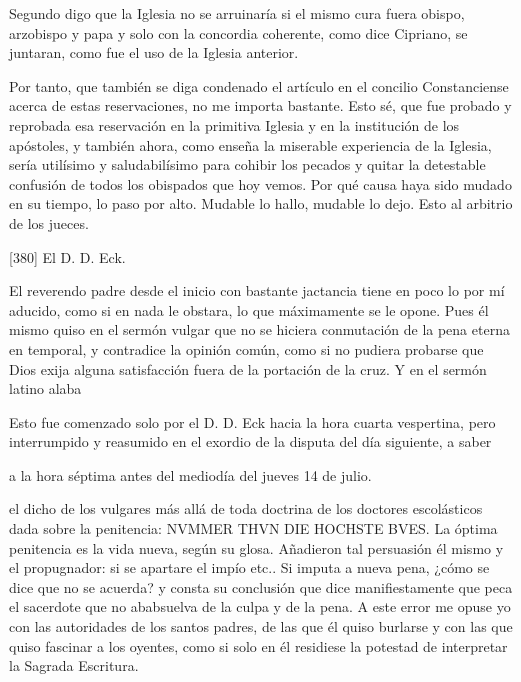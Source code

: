 Segundo digo que la Iglesia no se arruinaría si el mismo cura fuera obispo, arzobispo y papa y solo con la concordia coherente, como dice Cipriano, se juntaran, como fue el uso de la Iglesia anterior.

Por tanto, que también se diga condenado el artículo en el concilio Constanciense acerca de estas reservaciones, no me importa bastante. Esto sé, que fue probado y reprobada esa reservación en la primitiva Iglesia y en la institución de los apóstoles, y también ahora, como enseña la miserable experiencia de la Iglesia, sería utilísimo y saludabilísimo para cohibir los pecados y quitar la detestable confusión de todos los obispados que hoy vemos. Por qué causa haya sido mudado en su tiempo, lo paso por alto. Mudable lo hallo, mudable lo dejo. Esto al arbitrio de los jueces.

[380] El D. D. Eck.

El reverendo padre desde el inicio con bastante jactancia tiene en poco lo por mí aducido, como si en nada le obstara, lo que máximamente se le opone. Pues él mismo quiso en el sermón vulgar que no se hiciera conmutación de la pena eterna en temporal, y contradice la opinión común, como si no pudiera probarse que Dios exija alguna satisfacción fuera de la portación de la cruz. Y en el sermón latino alaba

Esto fue comenzado solo por el D. D. Eck hacia la hora cuarta vespertina, pero interrumpido y reasumido en el exordio de la disputa del día siguiente, a saber

a la hora séptima antes del mediodía del jueves 14 de julio.

el dicho de los vulgares más allá de toda doctrina de los doctores escolásticos dada sobre la penitencia: NVMMER THVN DIE HOCHSTE BVES. La óptima penitencia es la vida nueva, según su glosa. Añadieron tal persuasión él mismo y el propugnador: si se apartare el impío etc.. Si imputa a nueva pena, ¿cómo se dice que no se acuerda? y consta su conclusión que dice manifiestamente que peca el sacerdote que no ababsuelva de la culpa y de la pena. A este error me opuse yo con las autoridades de los santos padres, de las que él quiso burlarse y con las que quiso fascinar a los oyentes, como si solo en él residiese la potestad de interpretar la Sagrada Escritura.

